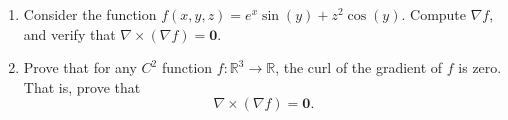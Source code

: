 \begin{problem}
\begin{enumerate}
\item Consider the function $f(x,y,z) = e^x\sin(y) + z^2\cos(y)$. Compute $\nabla f$, and verify that $\nabla \times(\nabla f) = \mathbf{0}$.
\item Prove that for any $C^2$ function $f:\mathbb{R}^3\rightarrow\mathbb{R}$, the curl of the gradient of $f$ is zero. That is, prove that
\[
\nabla \times(\nabla f) = \mathbf{0}.
\]
\end{enumerate}
\end{problem}